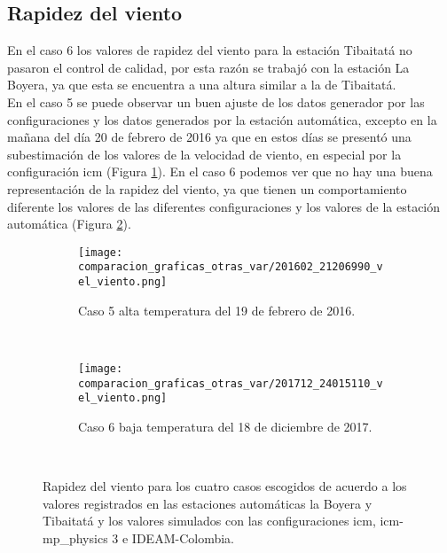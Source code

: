 \subsection{Rapidez del viento}

En el caso 6 los valores de rapidez del viento para la estación Tibaitatá no pasaron el control de calidad, por esta razón se trabajó con la estación La Boyera, ya que esta se encuentra a una altura similar a la de Tibaitatá.\\

En el caso 5 se puede observar un buen ajuste de los datos generador por las configuraciones y los datos generados por la estación automática, excepto en la mañana del día 20 de febrero de 2016 ya que en estos días se presentó una subestimación de los valores de la velocidad de viento, en especial por la configuración icm (Figura \ref{caso5_tiba_wrf_vv}). En el caso 6 podemos ver que no hay una buena representación de la rapidez del viento, ya que tienen un comportamiento diferente los valores de las diferentes configuraciones y los valores de la estación automática (Figura \ref{caso6_tiba_wrf_vv}).


\begin{figure}[H]
\centering    
\begin{subfigure}[normla]{0.4\textwidth}
\caption{Caso 5 alta temperatura del 19 de febrero de 2016.}
\label{caso5_tiba_wrf_vv}
\texttt{[image: comparacion\_graficas\_otras\_var/201602\_21206990\_vel\_viento.png]}
\end{subfigure}
~
\begin{subfigure}[normla]{0.4\textwidth}
\caption{Caso 6 baja temperatura del 18 de diciembre de 2017.}
\label{caso6_tiba_wrf_vv}
\texttt{[image: comparacion\_graficas\_otras\_var/201712\_24015110\_vel\_viento.png]}
\end{subfigure}
~
    \caption{Rapidez del viento para los cuatro casos escogidos de acuerdo a los valores registrados en las estaciones automáticas la Boyera y Tibaitatá y los valores simulados con las configuraciones icm, icm-mp\_physics 3 e IDEAM-Colombia.}
    \label{fig:wrf_vv_tibaitata}
\end{figure}


